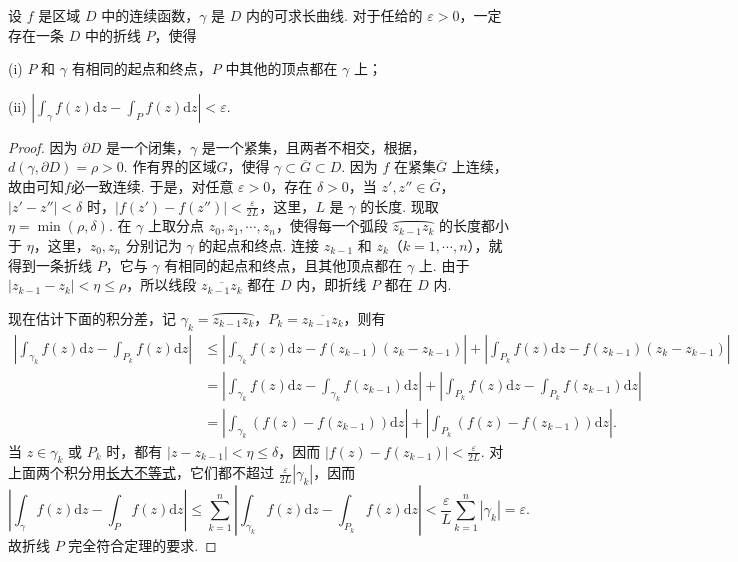 \documentclass[../../main.tex]{subfiles}%
\begin{document}
\begin{lemma}\label{lemma:引理:3.2.2}
设 \( f \) 是区域 \( D \) 中的连续函数，\( \gamma \) 是 \( D \) 内的可求长曲线. 对于任给的 \( \varepsilon > 0 \)，一定存在一条 \( D \) 中的折线 \( P \)，使得

(i) \( P \) 和 \( \gamma \) 有相同的起点和终点，\( P \) 中其他的顶点都在 \( \gamma \) 上；

(ii) \( \left| \int_\gamma f(z)\mathrm{d}z - \int_P f(z)\mathrm{d}z \right| < \varepsilon \).
\end{lemma}
\begin{proof}
因为 \( \partial D \) 是一个闭集，\( \gamma \) 是一个紧集，且两者不相交，根据，\( d(\gamma, \partial D) = \rho > 0 \). 作有界的区域\( G \)，使得 \( \gamma \subset \overline{G} \subset D \). 因为 \( f \) 在紧集\( \overline{G} \) 上连续，故由可知$f$必一致连续. 于是，对任意 \( \varepsilon > 0 \)，存在 \( \delta > 0 \)，当 \( z', z'' \in \overline{G} \)，\( |z' - z''| < \delta \) 时，\( |f(z') - f(z'')| < \frac{\varepsilon}{2L} \)，这里，\( L \) 是 \( \gamma \) 的长度. 现取 \( \eta = \min(\rho, \delta) \). 在 \( \gamma \) 上取分点 \( z_0, z_1, \cdots, z_n \)，使得每一个弧段 \( \wideparen{z_{k - 1}z_k} \) 的长度都小于 \( \eta \)，这里，\( z_0, z_n \) 分别记为 \( \gamma \) 的起点和终点. 连接 \( z_{k - 1} \) 和 \( z_k \)（\( k = 1, \cdots, n \)），就得到一条折线 \( P \)，它与 \( \gamma \) 有相同的起点和终点，且其他顶点都在 \( \gamma \) 上. 由于 \( |z_{k - 1} - z_k| < \eta \leqslant \rho \)，所以线段 \( \overline{z_{k - 1}z_k} \) 都在 \( D \) 内，即折线 \( P \) 都在 \( D \) 内.

现在估计下面的积分差，记 \( \gamma_k = \wideparen{z_{k - 1}z_k} \)，\( P_k = \overline{z_{k - 1}z_k} \)，则有
\begin{align*}
\left| \int_{\gamma_k} f(z)\mathrm{d}z - \int_{P_k} f(z)\mathrm{d}z \right|
&\leqslant \left| \int_{\gamma_k} f(z)\mathrm{d}z - f(z_{k - 1})(z_k - z_{k - 1}) \right|
+ \left| \int_{P_k} f(z)\mathrm{d}z - f(z_{k - 1})(z_k - z_{k - 1}) \right|
\\
&= \left| \int_{\gamma_k} f(z)\mathrm{d}z - \int_{\gamma_k} f(z_{k - 1})\mathrm{d}z \right| + \left| \int_{P_k} f(z)\mathrm{d}z - \int_{P_k} f(z_{k - 1})\mathrm{d}z \right|
\\
&= \left| \int_{\gamma_k} (f(z) - f(z_{k - 1}))\mathrm{d}z \right| + \left| \int_{P_k} (f(z) - f(z_{k - 1}))\mathrm{d}z \right|.
\end{align*}
当 \( z \in \gamma_k \) 或 \( P_k \) 时，都有 \( |z - z_{k - 1}| < \eta \leqslant \delta \)，因而 \( |f(z) - f(z_{k - 1})| < \frac{\varepsilon}{2L} \). 对上面两个积分用\hyperref[theorem:长大不等式]{长大不等式}，它们都不超过 \( \frac{\varepsilon}{2L}|\gamma_k| \)，因而
\[
\left| \int_\gamma f(z)\mathrm{d}z - \int_P f(z)\mathrm{d}z \right| \leqslant \sum_{k = 1}^n \left| \int_{\gamma_k} f(z)\mathrm{d}z - \int_{P_k} f(z)\mathrm{d}z \right|
< \frac{\varepsilon}{L} \sum_{k = 1}^n |\gamma_k|
= \varepsilon.
\]
故折线 \( P \) 完全符合定理的要求.
\end{proof}
\end{document}
